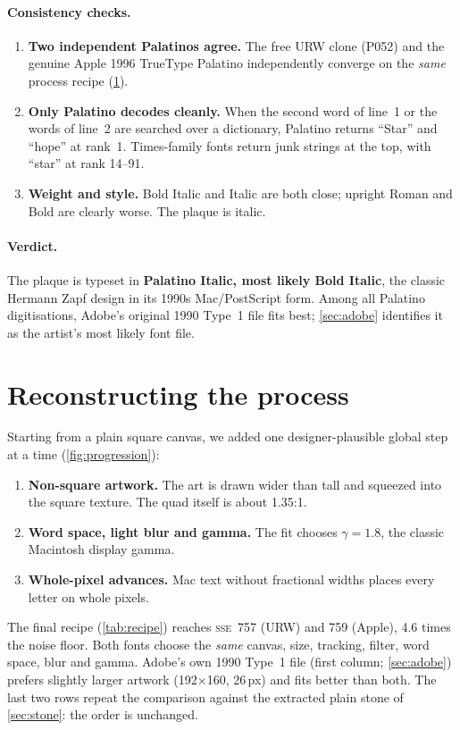\documentclass[10pt,a4paper]{article}
\newcommand{\q}[1]{``#1''}
\newcommand{\SSE}{\textsc{sse}}
\begin{document}
\paragraph{Consistency checks.}
\begin{enumerate}
\item \textbf{Two independent Palatinos agree.} The free URW clone (P052) and the genuine Apple 1996 TrueType
Palatino independently converge on the \emph{same} process recipe (\cref{sec:process}).
\item \textbf{Only Palatino decodes cleanly.} When the second word of line~1 or the words of line~2 are searched over
a dictionary, Palatino returns \q{Star} and \q{hope} at rank~1. Times-family fonts return junk strings at the top,
with \q{star} at rank 14--91.
\item \textbf{Weight and style.} Bold Italic and Italic are both close; upright Roman and Bold are clearly worse.
The plaque is italic.
\end{enumerate}

\paragraph{Verdict.} The plaque is typeset in \textbf{Palatino Italic, most likely Bold Italic}, the classic
Hermann Zapf design in its 1990s Mac/PostScript form. Among all Palatino digitisations, Adobe's original 1990 Type~1
file fits best; \cref{sec:adobe} identifies it as the artist's most likely font file.

\section{Reconstructing the process}
\label{sec:process}
Starting from a plain square canvas, we added one designer-plausible global step at a time (\cref{fig:progression}):
\begin{enumerate}
\item \textbf{Non-square artwork.} The art is drawn wider than tall and squeezed into the square texture. The quad
itself is about 1.35:1.
\item \textbf{Word space, light blur and gamma.} The fit chooses $\gamma=1.8$, the classic Macintosh display gamma.
\item \textbf{Whole-pixel advances.} Mac text without fractional widths places every letter on whole pixels.
\end{enumerate}
The final recipe (\cref{tab:recipe}) reaches \SSE~757 (URW) and 759 (Apple), 4.6 times the noise floor. Both fonts
choose the \emph{same} canvas, size, tracking, filter, word space, blur and gamma. Adobe's own 1990 Type~1 file
(first column; \cref{sec:adobe}) prefers slightly larger artwork (192$\times$160, 26\,px) and fits better than both.
The last two rows repeat the comparison against the extracted plain stone of \cref{sec:stone}: the order is unchanged.
\end{document}
